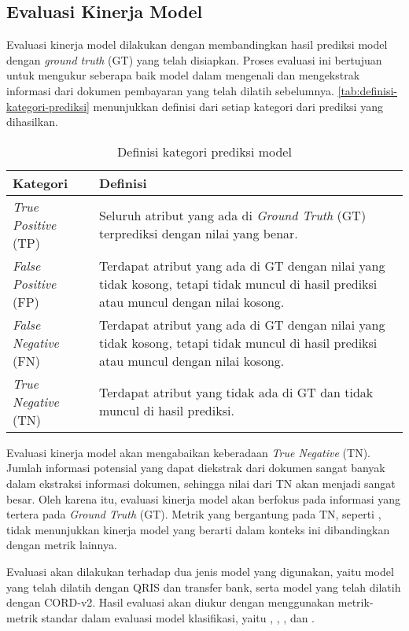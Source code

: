 \subsection{Evaluasi Kinerja Model}
\label{subsec:evaluasi-kinerja-model}

Evaluasi kinerja model dilakukan dengan membandingkan hasil prediksi model dengan \emph{ground truth} (GT) yang telah disiapkan. Proses evaluasi ini bertujuan untuk mengukur seberapa baik model dalam mengenali dan mengekstrak informasi dari dokumen pembayaran yang telah dilatih sebelumnya. \autoref{tab:definisi-kategori-prediksi} menunjukkan definisi dari setiap kategori dari prediksi yang dihasilkan.

\begin{table}[h!]
    \centering
    \caption{Definisi kategori prediksi model}
    \label{tab:definisi-kategori-prediksi}
    \begin{tabularx}{\textwidth}{|p{2.5cm}|X|}
        \hline
        \textbf{Kategori} & \textbf{Definisi} \\ \hline
        \emph{True Positive} (TP) & Seluruh atribut yang ada di \emph{Ground Truth} (GT) terprediksi dengan nilai yang benar. \\ \hline
        \emph{False Positive} (FP) & Terdapat atribut yang ada di GT dengan nilai yang tidak kosong, tetapi tidak muncul di hasil prediksi atau muncul dengan nilai kosong. \\ \hline
        \emph{False Negative} (FN) & Terdapat atribut yang ada di GT dengan nilai yang tidak kosong, tetapi tidak muncul di hasil prediksi atau muncul dengan nilai kosong. \\ \hline
        \emph{True Negative} (TN) & Terdapat atribut yang tidak ada di GT dan tidak muncul di hasil prediksi. \\ \hline
    \end{tabularx}
\end{table}

Evaluasi kinerja model akan mengabaikan keberadaan \emph{True Negative} (TN). Jumlah informasi potensial yang dapat diekstrak dari dokumen sangat banyak dalam ekstraksi informasi dokumen, sehingga nilai dari TN akan menjadi sangat besar. Oleh karena itu, evaluasi kinerja model akan berfokus pada informasi yang tertera pada \emph{Ground Truth} (GT). Metrik yang bergantung pada TN, seperti \accuracy, tidak menunjukkan kinerja model yang berarti dalam konteks ini dibandingkan dengan metrik lainnya. 

Evaluasi akan dilakukan terhadap dua jenis model yang digunakan, yaitu model \donut{} yang telah dilatih dengan \dataset{} QRIS dan transfer bank, serta model \donut{} yang telah dilatih dengan \dataset{} CORD-v2. Hasil evaluasi akan diukur dengan menggunakan metrik-metrik standar dalam evaluasi model klasifikasi, yaitu \accuracy, \precision, \recall, dan \fscore. 

